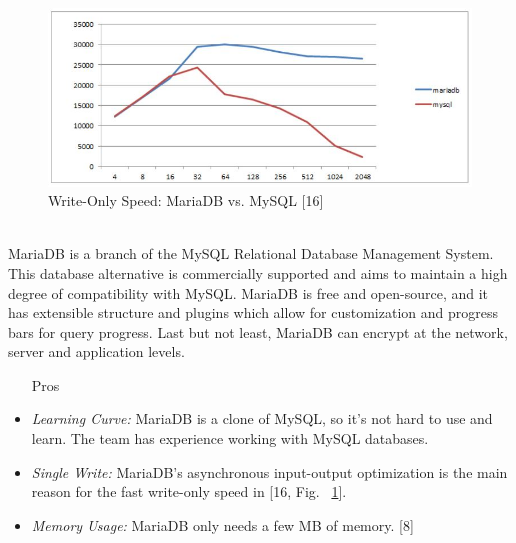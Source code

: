 \documentclass[12pt,journal,compsoc]{IEEEtran}
\newenvironment{subs}
  {\adjustwidth{1em}{0pt}}
  {\endadjustwidth}
\begin{document}
\begin{subs}
\begin{subs}
\begin{subs}
\begin{figure}[H]
\centering
\includegraphics[width=7in]{images/maria_mysql.JPG}
\caption{Write-Only Speed: MariaDB vs. MySQL [16]}
\label{fig:maria_mysql}
\end{figure}

\\
MariaDB is a branch of the MySQL Relational Database Management System. This database alternative is commercially supported and aims to maintain a high degree of compatibility with MySQL. MariaDB is free and open-source, and it has extensible structure and plugins which allow for customization and progress bars for query progress. Last but not least, MariaDB can encrypt at the network, server and application levels.

\begin{subs}
\begin{itemize}
    \item [{Pros}]
    \item \emph{Learning Curve:} MariaDB is a clone of MySQL, so it’s not hard to use and learn. The team has experience working with MySQL databases.
    \item \emph{Single Write:} MariaDB’s asynchronous input-output optimization is the main reason for the fast write-only speed in [16, Fig. ~\ref{fig:maria_mysql}].
    \item \emph{Memory Usage:} MariaDB only needs a few MB of memory. [8]
\end{itemize}
\end{subs}


\end{subs}
\end{subs}
\end{subs}
\end{document}
